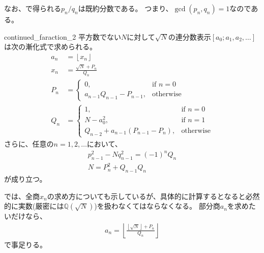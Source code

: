 なお、で得られる$p_n/q_n$は既約分数である。
つまり、$\gcd(p_n,q_n)=1$なのである。

\begin{Prop}{}{continued_faraction_2}
平方数でない$N$に対して$\sqrt{N}$の連分数表示$[a_0;a_1,a_2,\ldots]$は次の漸化式で求められる。
\begin{align*}
a_n &= \left \lfloor x_n \right \rfloor\\
x_n &= \frac{\sqrt{N} + P_n}{Q_n}\\
P_n &= 
\begin{cases}
0, &\mbox{if } n = 0\\
a_{n-1} Q_{n-1} - P_{n-1}, &\mbox{otherwise}
\end{cases}
\\
Q_n &= 
\begin{cases}
1, &\mbox{if } n = 0\\
N - a_0^2, &\mbox{if } n = 1\\
Q_{n-2} + a_{n-1}(P_{n-1} - P_n), &\mbox{otherwise}
\end{cases}
\end{align*}
さらに、任意の$n=1,2,\ldots$において、
\begin{align*}
p_{n-1}^2 - N q_{n-1}^2 = (-1)^n Q_n\\
N = P_n^2 + Q_{n-1}Q_n
\end{align*}
が成り立つ。
\end{Prop}

では、全商$x_n$の求め方についても示しているが、具体的に計算するとなると必然的に実数(厳密には$\mathbb{Q}(\sqrt{N})$)を扱わなくてはならなくなる。
部分商$a_n$を求めたいだけなら、
\begin{align*}
a_n = \left \lfloor \frac{\left \lfloor \sqrt{N} \right \rfloor + P_n}{Q_n} \right \rfloor
\end{align*}
で事足りる。



